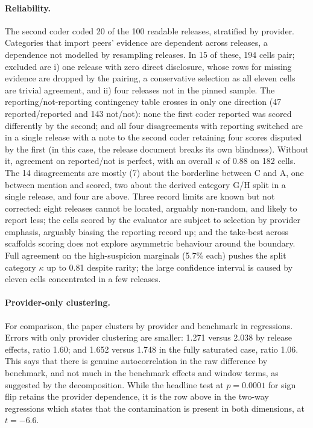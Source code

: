 \documentclass{article}
\begin{document}
\paragraph{Reliability.}
The second coder coded 20 of the 100 readable releases, stratified by provider. Categories that import peers' evidence are dependent across releases, a dependence not modelled by resampling releases. In 15 of these, 194 cells pair; excluded are i) one release with zero direct disclosure, whose rows for missing evidence are dropped by the pairing, a conservative selection as all eleven cells are trivial agreement, and ii) four releases not in the pinned sample. The reporting/not-reporting contingency table crosses in only one direction (47 reported/reported and 143 not/not): none the first coder reported was scored differently by the second; and all four disagreements with reporting switched are in a single release with a note to the second coder retaining four scores disputed by the first (in this case, the release document breaks its own blindness). Without it, agreement on reported/not is perfect, with an overall $\kappa$ of 0.88 on 182 cells. The 14 disagreements are mostly (7) about the borderline between C and A, one between mention and scored, two about the derived category G/H split in a single release, and four are above. Three record limits are known but not corrected: eight releases cannot be located, arguably non-random, and likely to report less; the cells scored by the evaluator are subject to selection by provider emphasis, arguably biasing the reporting record up; and the take-best across scaffolds scoring does not explore asymmetric behaviour around the boundary. Full agreement on the high-suspicion marginals (5.7\% each) pushes the split category $\kappa$ up to 0.81 despite rarity; the large confidence interval is caused by eleven cells concentrated in a few releases.

\paragraph{Provider-only clustering.}
For comparison, the paper clusters by provider and benchmark in regressions. Errors with only provider clustering are smaller: 1.271 versus 2.038 by release effects, ratio 1.60; and 1.652 versus 1.748 in the fully saturated case, ratio 1.06. This says that there is genuine autocorrelation in the raw difference by benchmark, and not much in the benchmark effects and window terms, as suggested by the decomposition. While the headline test at $p = 0.0001$ for sign flip retains the provider dependence, it is the row above in the two-way regressions which states that the contamination is present in both dimensions, at $t = -6.6$.
\end{document}
